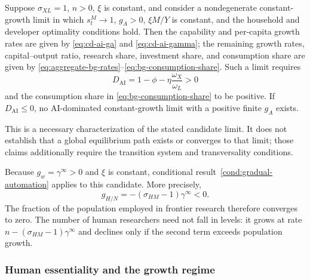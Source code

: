 \begin{conditionalresult}
\label{cond:ai-dominated-cd-limit}
Suppose $\sigma_{XL}=1$, $n>0$, $\xi$ is constant, and consider a nondegenerate
constant-growth limit in which $s^M_t\to1$, $g_A>0$, $\xi M/Y$ is constant, and the
household and developer optimality conditions hold. Then the capability and
per-capita growth rates are given by \eqref{eq:cd-ai-ga} and
\eqref{eq:cd-ai-gamma}; the remaining growth rates, capital--output ratio, research
share, investment share, and consumption share are given by
\eqref{eq:aggregate-bg-rates}--\eqref{eq:bg-consumption-share}. Such a limit requires
\begin{equation}
    D_{\mathrm{AI}}
    =1-\phi-\eta\frac{\omega_X}{\omega_L}>0
    \label{eq:ai-dominated-cd-necessary-stability}
\end{equation}
and the consumption share in \eqref{eq:bg-consumption-share} to be positive. If
$D_{\mathrm{AI}}\leq0$, no AI-dominated constant-growth limit with a positive finite
$g_A$ exists.
\end{conditionalresult}

This is a necessary characterization of the stated candidate limit. It does
not establish that a global equilibrium path exists or converges to that limit; those
claims additionally require the transition system and transversality conditions.

Because $g_w=\gamma^\infty>0$ and $\xi$ is constant, conditional
result~\ref{cond:gradual-automation} applies to this candidate. More precisely,
\begin{equation}
    g_{H/N}
    =
    -(\sigma_{HM}-1)\gamma^\infty<0.
    \label{eq:human-research-population-share}
\end{equation}
The fraction of the population employed in frontier research therefore converges to
zero. The number of human researchers need not fall in levels: it grows at rate
$n-(\sigma_{HM}-1)\gamma^\infty$ and declines only if the second term exceeds population
growth.

\subsubsection{Human essentiality and the growth regime}

